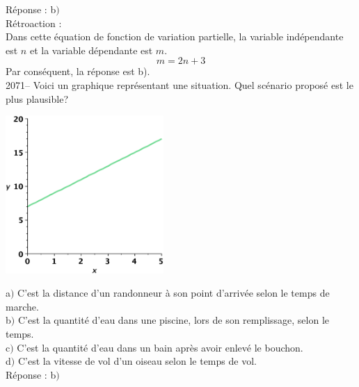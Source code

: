 \documentclass[letterpaper, 12pt]{article}
\begin{document}
R\'eponse : b$)$\\

R\'etroaction :\\
Dans cette \'equation de fonction de variation partielle, la variable ind\'ependante est $n$ et la variable d\'ependante est $m$. \\
\begin{equation*}
 m = 2n + 3
\end{equation*}
Par cons\'equent, la r\'eponse est b).\\

2071-- Voici un graphique repr\'esentant une situation. Quel sc\'enario propos\'e est le plus plausible?
\begin{center}
 \includegraphics[width=6cm]{Q2071.eps}
\end{center}

a$)$ C'est la distance d'un randonneur \`a son point d'arriv\'ee selon le temps de marche.\\
b$)$ C'est la quantit\'e d'eau dans une piscine, lors de son remplissage, selon le temps.\\
c$)$ C'est la quantit\'e d'eau dans un bain apr\`es avoir enlev\'e le bouchon. \\
d$)$ C'est la vitesse de vol d'un oiseau selon le temps de vol.\\

R\'eponse : b$)$\\
\end{document}
